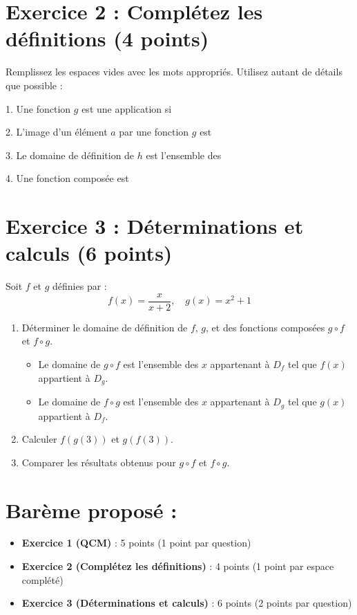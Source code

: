 \documentclass[a4paper,12pt]{article}
\begin{document}
\section*{Exercice 2 : Complétez les définitions (4 points)}
Remplissez les espaces vides avec les mots appropriés. Utilisez autant de détails que possible :

\vspace{0.5cm}
1. Une fonction $g$ est une application si \underline{\hspace{15cm}}  
\vspace{0.5cm}

2. L'image d'un élément $a$ par une fonction $g$ est \underline{\hspace{15cm}}  
\vspace{0.5cm}

3. Le domaine de définition de $h$ est l'ensemble des \underline{\hspace{15cm}}  
\vspace{0.5cm}

4. Une fonction composée est \underline{\hspace{15cm}}  
\vspace{0.5cm}

\section*{Exercice 3 : Déterminations et calculs (6 points)}
Soit $f$ et $g$ définies par : 
\[
f(x) = \frac{x}{x + 2}, \quad g(x) = x^2 + 1
\]

\begin{enumerate}
    \item Déterminer le domaine de définition de $f$, $g$, et des fonctions composées $g \circ f$ et $f \circ g$. 
    \begin{itemize}
        \item Le domaine de $g \circ f$ est l'ensemble des $x$ appartenant à $D_f$ tel que $f(x)$ appartient à $D_g$.
        \item Le domaine de $f \circ g$ est l'ensemble des $x$ appartenant à $D_g$ tel que $g(x)$ appartient à $D_f$.
    \end{itemize}
    
    \item Calculer $f(g(3))$ et $g(f(3))$.
    
    \item Comparer les résultats obtenus pour $g \circ f$ et $f \circ g$.
\end{enumerate}

\section*{Barème proposé :}
\begin{itemize}
    \item \textbf{Exercice 1 (QCM)} : 5 points (1 point par question)
    \item \textbf{Exercice 2 (Complétez les définitions)} : 4 points (1 point par espace complété)
    \item \textbf{Exercice 3 (Déterminations et calculs)} : 6 points (2 points par question)
\end{itemize}
\end{document}
